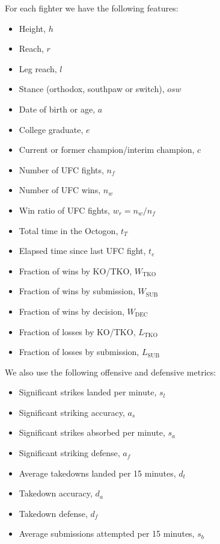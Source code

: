For each fighter we have the following features:

\begin{itemize}[noitemsep]
  \item Height, $h$
  \item Reach, $r$
  \item Leg reach, $l$
  \item Stance (orthodox, southpaw or switch), $osw$
  \item Date of birth or age, $a$
  \item College graduate, $e$
  \item Current or former champion/interim champion, $c$
  \item Number of UFC fights, $n_f$
  \item Number of UFC wins, $n_w$
  \item Win ratio of UFC fights, $w_r=n_w/n_f$
  \item Total time in the Octogon, $t_T$
  \item Elapsed time since last UFC fight, $t_e$
  \item Fraction of wins by KO/TKO, $W_{\textrm{TKO}}$
  \item Fraction of wins by submission, $W_{\textrm{SUB}}$
  \item Fraction of wins by decision, $W_{\textrm{DEC}}$
  \item Fraction of losses by KO/TKO, $L_{\textrm{TKO}}$
  \item Fraction of losses by submission, $L_{\textrm{SUB}}$
\end{itemize}

\noindent
We also use the following offensive and defensive metrics:

\begin{itemize}[noitemsep]
  \item Significant strikes landed per minute, $s_l$
  \item Significant striking accuracy, $a_s$
  \item Significant strikes absorbed per minute, $s_a$
  \item Significant striking defense, $a_f$
  \item Average takedowns landed per 15 minutes, $d_t$
  \item Takedown accuracy, $d_a$
  \item Takedown defense, $d_f$
  \item Average submissions attempted per 15 minutes, $s_b$
\end{itemize}

